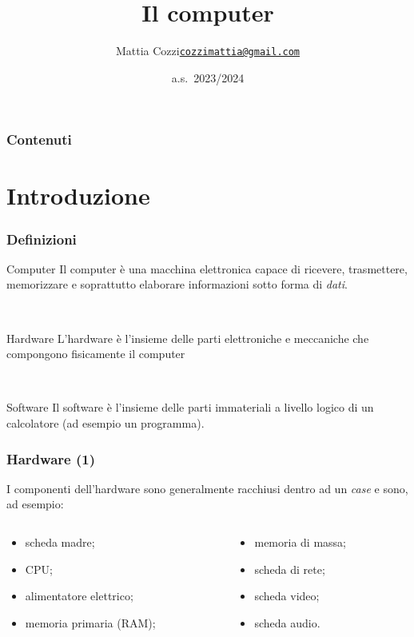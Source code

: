 \documentclass[]{beamer}
\title{Il computer}
\author{\texorpdfstring{Mattia Cozzi\newline\href{mailto:cozzimattia@gmail.com}{\texttt{cozzimattia@gmail.com}}}{Mattia Cozzi}}
\date{a.s.~2023/2024}
\begin{document}
\begin{frame}
  \titlepage
\end{frame}


\begin{frame}
\frametitle{Contenuti}
\tableofcontents
\end{frame}

\section{Introduzione}

\begin{frame}
\frametitle{Definizioni}
\begin{block}{Computer}
  Il computer è una macchina elettronica capace di ricevere, trasmettere, memorizzare e soprattutto elaborare informazioni sotto forma di \emph{dati}.
\end{block}\pause

~

\begin{block}{Hardware}
  L'hardware è l'insieme delle parti elettroniche e meccaniche che compongono fisicamente il computer
\end{block}\pause

~

\begin{block}{Software}
  Il software è l'insieme delle parti immateriali a livello logico di un calcolatore (ad esempio un programma).
\end{block}
\end{frame}



\begin{frame}
\frametitle{Hardware (1)}
I componenti dell'hardware sono generalmente racchiusi dentro ad un \emph{case}{\pause} e sono, ad esempio:
\begin{columns}
  \begin{column}{0.4\textwidth}
    \begin{itemize}
      \item scheda madre;\pause
      \item CPU;\pause
      \item alimentatore elettrico;\pause
      \item memoria primaria (RAM);\pause
    \end{itemize}
    \end{column}
  \begin{column}{0.4\textwidth}
    \begin{itemize}
      \item memoria di massa;\pause
      \item scheda di rete;\pause
      \item scheda video;\pause
      \item scheda audio.
    \end{itemize}
    \end{column}
\end{columns}
\end{frame}
\end{document}
